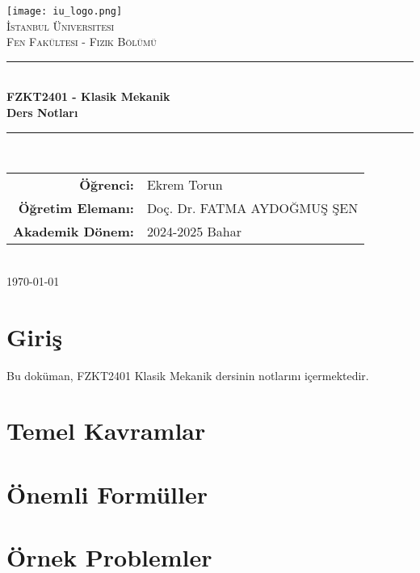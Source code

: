 \documentclass[12pt,a4paper]{article}
\begin{document}
\begin{titlepage}
    \centering
    \texttt{[image: iu\_logo.png]}\\[1cm]
    {\scshape\LARGE İstanbul Üniversitesi\\}
    {\scshape\Large Fen Fakültesi - Fizik Bölümü\\[0.5cm]}
    \rule{\linewidth}{0.2mm} \\[0.4cm]
    { \huge \bfseries FZKT2401 - Klasik Mekanik\\
    Ders Notları\\[0.4cm] }
    \rule{\linewidth}{0.2mm} \\[1.5cm]
    
    {\large
    \begin{tabular}{rl}
        \textbf{Öğrenci:} & Ekrem Torun \\
        \textbf{Öğretim Elemanı:} & Doç. Dr. FATMA AYDOĞMUŞ ŞEN \\
        \textbf{Akademik Dönem:} & 2024-2025 Bahar \\
    \end{tabular}}\\[2cm]
    
    {\large \today}
\end{titlepage}

\tableofcontents
\newpage

\section{Giriş}
Bu doküman, FZKT2401 Klasik Mekanik dersinin notlarını içermektedir.

\section{Temel Kavramlar}

\section{Önemli Formüller}

\section{Örnek Problemler}
\end{document}
